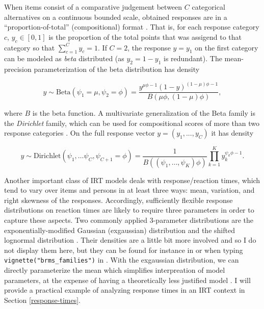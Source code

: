 \documentclass[
]{jss}
\begin{document}
When items consist of a comparative judgement between \(C\) categorical
alternatives on a continuous bounded scale, obtained responses are in a
``proportion-of-total'' (compositional) format \citep{hijazi2009}. That
is, for each response category \(c\), \(y_c \in [0, 1]\) is the
proportion of the total points that was assigend to that category so
that \(\sum_{c=1}^C y_c = 1\). If \(C = 2\), the response \(y = y_1\) on
the first category can be modeled as \emph{beta} distributed (as
\(y_2 = 1 - y_1\) is redundant). The mean-precision parameterization of
the beta distribution has density

\[
y \sim \text{Beta}(\psi_1 = \mu, \psi_2 = \phi) = 
\frac{y^{\mu \phi - 1} (1-y)^{(1-\mu) \phi-1}}{B(\mu \phi, (1-\mu) \phi)},
\]

where \(B\) is the beta function. A multivariate generalization of the
Beta family is the \emph{Dirichlet} family, which can be used for
compositional scores of more than two response categories
\citep{hijazi2009}. On the full response vector \(y = (y_1, ..., y_C)\)
it has density

\[
y \sim \text{Dirichlet}(\psi_1, \ldots \psi_C, \psi_{C+1} = \phi) = 
 \frac{1}{B((\psi_{1}, \ldots, \psi_{K}) \phi)} 
 \prod_{k=1}^K y_{k}^{\psi_{k} \phi - 1}.
\]

Another important class of IRT models deals with response/reaction
times, which tend to vary over items and persons in at least three ways:
mean, variation, and right skewness of the responses. Accordingly,
sufficiently flexible response distributions on reaction times are
likely to require three parameters in order to capture these aspects.
Two commonly applied 3-parameter distributions are the
exponentially-modified Gaussian (exgaussian) distribution and the
shifted lognormal distribution \citep{heathcote1991, wagenmakers2007}.
Their densities are a little bit more involved and so I do not display
them here, but they can be found for instance in \citet{wagenmakers2007}
or when typing \texttt{vignette("brms\_families")} in . With
the exgaussian distribution, we can directly parameterize the mean which
simplifies interpreation of model parameters, at the expense of having a
theoretically less justified model \citep{heathcote1991}. I will provide
a practical example of analyzing response times in an IRT context in
Section \ref{response-times}.
\end{document}
